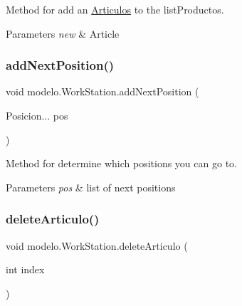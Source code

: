 Method for add an \mbox{\hyperlink{classmodelo_1_1_articulos}{Articulos}} to the list\+Productos. 


\begin{DoxyParams}{Parameters}
{\em new} & Article \\
\hline
\end{DoxyParams}
\mbox{\label{classmodelo_1_1_work_station_ab1d63cc56798b17b893f8bb70c1445ff}} 
\subsubsection{\texorpdfstring{add\+Next\+Position()}{addNextPosition()}}
{\footnotesize\ttfamily void modelo.\+Work\+Station.\+add\+Next\+Position (\begin{DoxyParamCaption}\item[{Posicion...}]{pos }\end{DoxyParamCaption})}



Method for determine which positions you can go to. 


\begin{DoxyParams}{Parameters}
{\em pos} & list of next positions \\
\hline
\end{DoxyParams}
\mbox{\label{classmodelo_1_1_work_station_a32b6c88273b4642b6137f9b9f637650e}} 
\subsubsection{\texorpdfstring{delete\+Articulo()}{deleteArticulo()}\hspace{0.1cm}{\footnotesize\ttfamily [1/2]}}
{\footnotesize\ttfamily void modelo.\+Work\+Station.\+delete\+Articulo (\begin{DoxyParamCaption}\item[{int}]{index }\end{DoxyParamCaption})}



